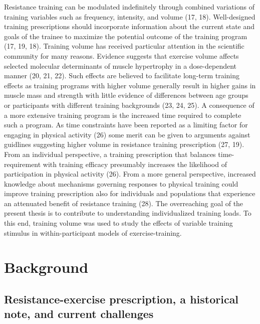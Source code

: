 \documentclass[twoside,10pt]{gihclass} %
\begin{document}
Resistance training can be modulated indefinitely through combined variations of training variables such as frequency, intensity, and volume
(17, 18).
Well-designed training prescriptions should incorporate information about the current state and goals of the trainee to maximize the potential outcome of the training program
(17, 19, 18).
Training volume has received particular attention in the scientific community for many reasons. Evidence suggests that exercise volume affects selected molecular determinants of muscle hypertrophy in a dose-dependent manner
(20, 21, 22).
Such effects are believed to facilitate long-term training effects as training programs with higher volume generally result in higher gains in muscle mass and strength with little evidence of differences between age groups or participants with different training backgrounds
(23, 24, 25).
A consequence of a more extensive training program is the increased time required to complete such a program. As time constraints have been reported as a limiting factor for engaging in physical activity
(26)
some merit can be given to arguments against guidlines suggesting higher volume in resistance training prescription
(27, 19).
From an individual perspective, a training prescription that balances time-requirement with training efficacy presumably increases the likelihood of participation in physical activity (26).
From a more general perspective, increased knowledge about mechanisms governing responses to physical training could improve training prescription also for individuals and populations that experience an attenuated benefit of resistance training
(28).
The overreaching goal of the present thesis is to contribute to understanding individualized training loads. To this end, training volume was used to study the effects of variable training stimulus in within-participant models of exercise-training.

\hypertarget{background}{%
\chapter{Background}\label{background}}

\hypertarget{resistance-exercise-prescription-a-historical-note-and-current-challenges}{%
\section{Resistance-exercise prescription, a historical note, and current challenges}\label{resistance-exercise-prescription-a-historical-note-and-current-challenges}}
\end{document}
